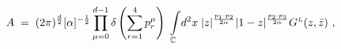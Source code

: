 \begin{equation}
 \label{tachions_1} 
A \; =\; (2\pi)^{d\over 2} [\alpha]^{-{1\over 2}}
\prod\limits_{\mu = 0}^{d-1} \delta\left(\sum\limits_{r=1}^4 p_r^\mu \right)\;
\int\limits_{\mathbb{C}}\!d^2 x\;
|z|^{\frac{p_1\cdot p_2}{2\alpha}} |1-z|^{\frac{p_2\cdot p_3}{2\alpha}}
G^{\scriptscriptstyle L}(z,\bar z)  \ ,
\end{equation}

